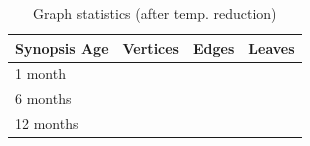 \begin{table}[h!]
    \renewcommand{\arraystretch}{1.3}
    \caption{Graph statistics (after temp. reduction)}
    \label{tbl:graph-stats}
    \begin{center}
        \begin{tabular}{|l|c|c|c|}
            \hline
            Synopsis Age & Vertices & Edges & Leaves \\
            \hline
            1 month & & & \\
            \hline
            6 months & & & \\
            \hline
            12 months & & & \\
            \hline
        \end{tabular}
    \end{center}
\end{table}



